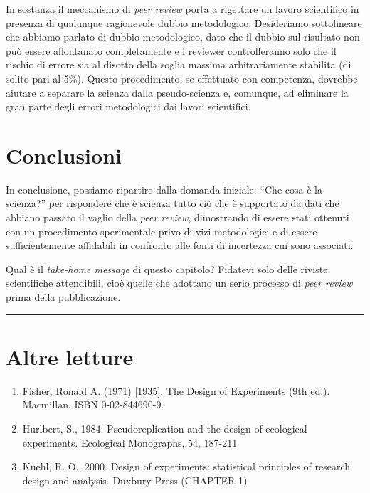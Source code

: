 \documentclass[a4paper,12pt,oneside]{book}
\providecommand{\tightlist}{%
  \setlength{\itemsep}{0pt}\setlength{\parskip}{0pt}}
\begin{document}
In sostanza il meccanismo di \emph{peer review} porta a rigettare un lavoro scientifico in presenza di qualunque ragionevole dubbio metodologico. Desideriamo sottolineare che abbiamo parlato di dubbio metodologico, dato che il dubbio sul risultato non può essere allontanato completamente e i reviewer controlleranno solo che il rischio di errore sia al disotto della soglia massima arbitrariamente stabilita (di solito pari al 5\%). Questo procedimento, se effettuato con competenza, dovrebbe aiutare a separare la scienza dalla pseudo-scienza e, comunque, ad eliminare la gran parte degli errori metodologici dai lavori scientifici.

\hypertarget{conclusioni}{%
\section{Conclusioni}\label{conclusioni}}

In conclusione, possiamo ripartire dalla domanda iniziale: ``Che cosa è la scienza?'' per rispondere che è scienza tutto ciò che è supportato da dati che abbiano passato il vaglio della \emph{peer review}, dimostrando di essere stati ottenuti con un procedimento sperimentale privo di vizi metodologici e di essere sufficientemente affidabili in confronto alle fonti di incertezza cui sono associati.

Qual è il \emph{take-home message} di questo capitolo? Fidatevi solo delle riviste scientifiche attendibili, cioè quelle che adottano un serio processo di \emph{peer review} prima della pubblicazione.

\begin{center}\rule{0.5\linewidth}{0.5pt}\end{center}

\hypertarget{altre-letture}{%
\section{Altre letture}\label{altre-letture}}

\begin{enumerate}
\def\labelenumi{\arabic{enumi}.}
\tightlist
\item
  Fisher, Ronald A. (1971) {[}1935{]}. The Design of Experiments (9th ed.). Macmillan. ISBN 0-02-844690-9.
\item
  Hurlbert, S., 1984. Pseudoreplication and the design of ecological experiments. Ecological Monographs, 54, 187-211
\item
  Kuehl, R. O., 2000. Design of experiments: statistical principles of research design and analysis. Duxbury Press (CHAPTER 1)
\end{enumerate}
\end{document}
